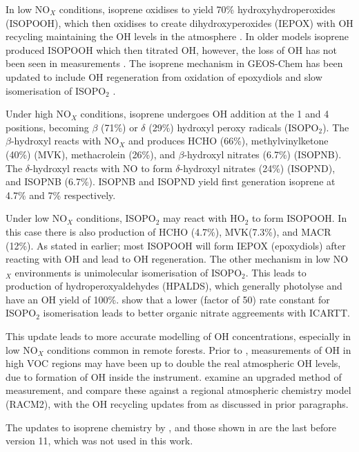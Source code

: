    In low NO$_X$ conditions, isoprene oxidises to yield 70\% hydroxyhydroperoxides (ISOPOOH), which then oxidises to create dihydroxyperoxides (IEPOX) with OH recycling maintaining the OH levels in the atmosphere \citep{Paulot2009b}.
    In older models isoprene produced ISOPOOH which then titrated OH, however, the loss of OH has not been seen in measurements \citep{Paulot2009b,Mao2013}.
    The isoprene mechanism in GEOS-Chem has been updated to include OH regeneration from oxidation of epoxydiols and slow isomerisation of ISOPO$_2$ \citep{Mao2013}.
    
    Under high NO$_X$ conditions, isoprene undergoes OH addition at the 1 and 4 positions, becoming $\beta$ (71\%) or $\delta$ (29\%) hydroxyl peroxy radicals (ISOPO$_2$). 
    The $\beta$-hydroxyl reacts with NO$_X$ and produces HCHO (66\%), methylvinylketone (40\%) (MVK), methacrolein (26\%), and $\beta$-hydroxyl nitrates (6.7\%) (ISOPNB).
    The $\delta$-hydroxyl reacts with NO to form $\delta$-hydroxyl nitrates (24\%) (ISOPND), and ISOPNB (6.7\%).
    ISOPNB and ISOPND yield first generation isoprene at 4.7\% and 7\% respectively.
    
    Under low NO$_X$ conditions, ISOPO$_2$ may react with HO$_2$ to form ISOPOOH.
    In this case there is also production of HCHO (4.7\%), MVK(7.3\%), and MACR (12\%).
    As stated in earlier; most ISOPOOH will form IEPOX (epoxydiols) after reacting with OH and lead to OH regeneration.
    The other mechanism in low NO$_X$ environments is unimolecular isomerisation of ISOPO$_2$.
    This leads to production of hydroperoxyaldehydes (HPALDS), which generally photolyse and have an OH yield of 100\%.
    \citet{Mao2013} show that a lower (factor of 50) rate constant for ISOPO$_2$ isomerisation leads to better organic nitrate aggreements with ICARTT. 
    
    This update leads to more accurate modelling of OH concentrations, especially in low NO$_X$ conditions common in remote forests.
    Prior to \citet{Mao2012}, measurements of OH in high VOC regions may have been up to double the real atmospheric OH levels, due to formation of OH inside the instrument.
    \citet{Mao2012} examine an upgraded method of measurement, and compare these against a regional atmospheric chemistry model (RACM2), with the OH recycling updates from \citet{Paulot2009b} as discussed in prior paragraphs.
    
    The updates to isoprene chemistry by \citet{Mao2013}, and those shown in \cite{Crounse2011,Crounse2012} are the last before version 11, which was not used in this work.

